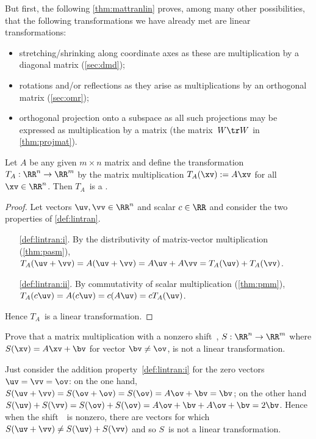 \begin{example} \label{eg:}
But first, the following \autoref{thm:mattranlin} proves, among many other possibilities, that the following transformations we have already met are linear transformations:
\begin{itemize}
\item stretching\slash shrinking along coordinate axes as these are multiplication by a diagonal matrix (\autoref{sec:dmd});
\item rotations and/or reflections as they arise as multiplications by an orthogonal matrix (\autoref{sec:omr});
\item orthogonal projection onto a subspace as all such projections may be expressed as multiplication by a matrix (the matrix~\(W\tr W\) in \autoref{thm:projmat}).
\end{itemize}
\end{example}


\begin{theorem} \label{thm:mattranlin} 
Let \(A\) be any given \(m\times n\) matrix and define the transformation \(T_A:\RR^n\to\RR^m\)  by the matrix multiplication \(T_A(\xv):=A\xv\) for all \(\xv\in\RR^n\). 
Then \(T_A\)~is a .
\end{theorem}
\begin{proof} 
Let vectors \(\uv,\vv\in\RR^n\) and scalar \(c\in\RR\) and consider the two properties of \autoref{def:lintran}.
\begin{itemize}
\item[\ref{def:lintran:i}.] By the distributivity of matrix-vector multiplication (\autoref{thm:pasm}), \(T_A(\uv+\vv)=A(\uv+\vv)=A\uv+A\vv=T_A(\uv)+T_A(\vv)\).
\item[\ref{def:lintran:ii}.] By commutativity of scalar multiplication (\autoref{thm:pmm}), \(T_A(c\uv)=A(c\uv)=c(A\uv)=cT_A(\uv)\).
\end{itemize}
Hence \(T_A\)~is a linear transformation.
\end{proof}



\begin{example} \label{eg:}
Prove that a matrix multiplication with a nonzero shift~\bv, \(S:\RR^n\to\RR^m\) where \(S(\xv)=A\xv+\bv\) for vector \(\bv\neq\ov\), is not a linear transformation.
\begin{solution} 
Just consider the addition property~\ref{def:lintran:i} for the zero vectors \(\uv=\vv=\ov\):  
on the one hand, \(S(\uv+\vv)=S(\ov+\ov)=S(\ov)=A\ov+\bv=\bv\); 
on the other hand \(S(\uv)+S(\vv)=S(\ov)+S(\ov)=A\ov+\bv+A\ov+\bv=2\bv\).  
Hence when the shift~\bv\ is nonzero, there are vectors for which \(S(\uv+\vv)\neq S(\uv)+S(\vv)\) and so \(S\)~is not a linear transformation.
\end{solution}
\end{example}



